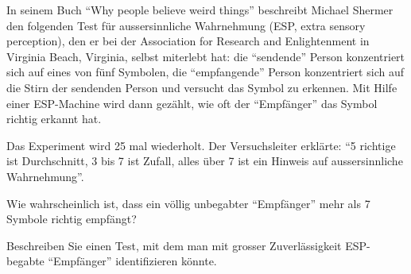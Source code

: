 In seinem Buch ``Why people believe weird things'' beschreibt Michael
Shermer den folgenden Test für aussersinnliche Wahrnehmung
(ESP, extra sensory perception), den er bei der Association for Research and Enlightenment in Virginia Beach, Virginia, selbst miterlebt hat:
die ``sendende'' Person konzentriert sich
auf eines von fünf Symbolen, die ``empfangende'' Person konzentriert sich 
auf die Stirn der sendenden Person und versucht das Symbol zu erkennen.
Mit Hilfe einer ESP-Machine wird dann gezählt, wie oft der ``Empfänger''
das Symbol richtig erkannt hat.
\begin{center}
\end{center}
Das Experiment wird 25 mal wiederholt. Der Versuchsleiter erklärte:
``5 richtige ist Durchschnitt, 3 bis 7 ist Zufall,
alles über 7 ist ein Hinweis auf aussersinnliche Wahrnehmung''.
\begin{teilaufgaben}
\item Wie wahrscheinlich ist, dass ein völlig unbegabter ``Empfänger''
mehr als 7 Symbole richtig empfängt?
\item Beschreiben Sie einen Test, mit dem man mit grosser Zuverlässigkeit
ESP-begabte ``Empfänger'' identifizieren könnte.
\end{teilaufgaben}

